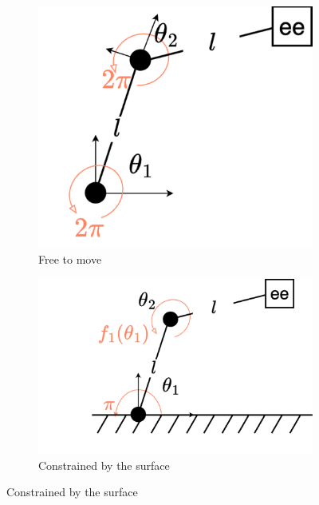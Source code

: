 \begin{figure}
    \centering
    \begin{subfigure}[t]{0.32\linewidth}
        \centering
        \includegraphics[width=\linewidth,height=\panelheight,keepaspectratio]{figures/ch2/ch2-planar-manipulator-free.pdf}
        \caption{Free to move}
        \label{fig:planar-manipulation-simple}
    \end{subfigure}\hfill
    \begin{subfigure}[t]{0.32\linewidth}
        \centering
        \includegraphics[width=\linewidth,height=\panelheight,keepaspectratio]{figures/ch2/ch2-planar-manipulator-floor.pdf}
        \caption{Constrained by the surface}
        \label{fig:planar-manipulator-floor}

\end{subfigure}
\end{figure}
